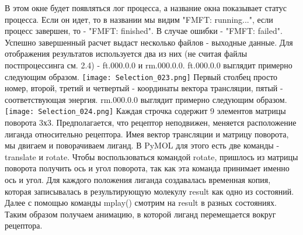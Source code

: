 \documentclass[a4paper,12pt]{article}
\numberwithin{equation}{section}%
\begin{document}
\newline
\newline
В этом окне будет появляться лог процесса, а название окна показывает статус процесса. Если он идет, то в названии мы видим "FMFT: running...", если процесс завершен, то - "FMFT: finished". В случае ошибки - "FMFT: failed".
\newline
Успешно завершенный расчет выдаст несколько файлов - выходные данные. Для отображения результатов используется два из них (не считая файлы постпроцессинга см. 2.4) - ft.000.0.0 и rm.000.0.0.
\newline
ft.000.0.0 выглядит примерно следующим образом.
\newline
\newline
\texttt{[image: Selection\_023.png]}
\newline
\newline
Первый столбец просто номер, второй, третий и четвертый - координаты вектора трансляции, пятый - соответствующая энергия.
\newline
rm.000.0.0 выглядит примерно следующим образом.
\newline
\texttt{[image: Selection\_024.png]}
\newline
\newline
Каждая строчка содержит 9 элементов матрицы поворота 3х3.
\newline
Предполагается, что рецептор неподвижен, меняется расположение лиганда относительно рецептора. Имея вектор трансляции и матрицу поворота, мы двигаем и поворачиваем лиганд. В PyMOL для этого есть две команды - translate и rotate. Чтобы воспользоваться командой rotate, пришлось из матрицы поворота получить ось и угол поворота, так как эта команда принимает именно ось и угол.
\newline
Для каждого положения лиганда создавалась временная копия, которая записывалась в результирующую молекулу result как одно из состояний. Далее с помощью команды mplay() смотрим на result в разных состояниях. Таким образом получаем анимацию, в которой лиганд перемещается вокруг рецептора.
\newpage
\end{document}
